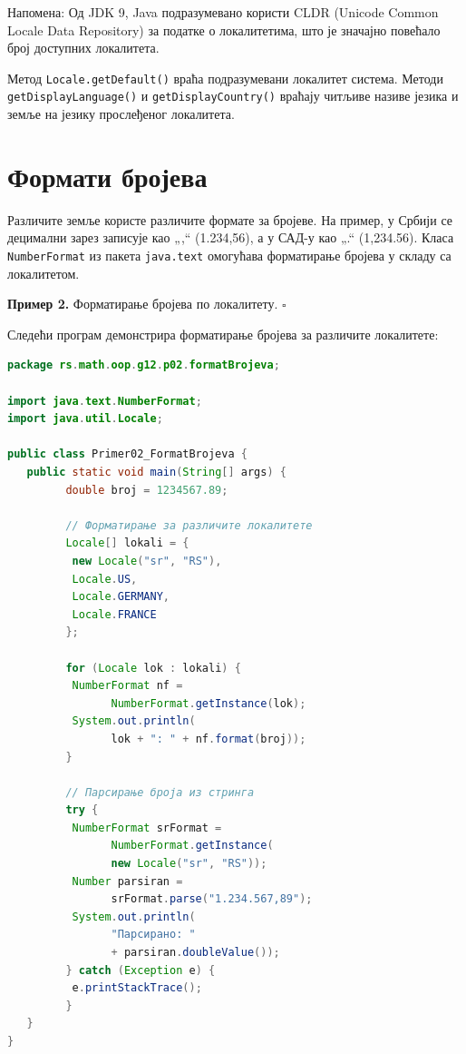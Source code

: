 Напомена: Од JDK 9, Java подразумевано користи CLDR (Unicode Common Locale Data Repository) за податке о локалитетима, што је значајно повећало број доступних локалитета.


Метод \texttt{Locale.getDefault()} враћа подразумевани локалитет система. Методи \texttt{getDisplayLanguage()} и \texttt{getDisplayCountry()} враћају читљиве називе језика и земље на језику прослеђеног локалитета.


\section{Формати бројева}

Различите земље користе различите формате за бројеве. На пример, у Србији се децимални зарез записује као „,“ (1.234,56), а у САД-у као „.“ (1,234.56). Класа \texttt{NumberFormat} из пакета \texttt{java.text} омогућава форматирање бројева у складу са локалитетом.


\bigskip

\noindent \textbf{Пример 2.} Форматирање бројева по локалитету. $\square$

\medskip

Следећи програм демонстрира форматирање бројева за различите локалитете:


\begin{lstlisting}[language=Java]
package rs.math.oop.g12.p02.formatBrojeva;
 
import java.text.NumberFormat;
import java.util.Locale;
 
public class Primer02_FormatBrojeva {
   public static void main(String[] args) {
         double broj = 1234567.89;
 
         // Форматирање за различите локалитете
         Locale[] lokali = {
          new Locale("sr", "RS"),
          Locale.US,
          Locale.GERMANY,
          Locale.FRANCE
         };
 
         for (Locale lok : lokali) {
          NumberFormat nf =
                NumberFormat.getInstance(lok);
          System.out.println(
                lok + ": " + nf.format(broj));
         }
 
         // Парсирање броја из стринга
         try {
          NumberFormat srFormat =
                NumberFormat.getInstance(
                new Locale("sr", "RS"));
          Number parsiran =
                srFormat.parse("1.234.567,89");
          System.out.println(
                "Парсирано: "
                + parsiran.doubleValue());
         } catch (Exception e) {
          e.printStackTrace();
         }
   }
}
\end{lstlisting}



